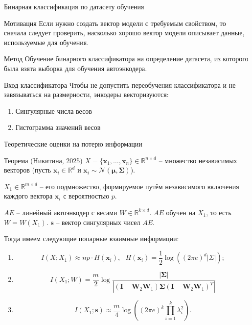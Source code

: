 \documentclass{beamer}
\begin{document}
\begin{frame}{Бинарная классификация по датасету обучения}
\begin{block}{Мотивация}
Если нужно создать вектор модели с требуемым свойством, то сначала следует проверить, насколько хорошо вектор модели описывает данные, используемые для обучения.
\end{block}
\begin{block}{Метод}
Обучение бинарного классификатора на определение датасета, из которого была взята выборка для обучения автоэнкодера.
\end{block}
\begin{block}{Вход классификатора}
Чтобы не допустить переобучения классификатора и не завязываться на размерности, энкодеры векторизуются:

\begin{enumerate}
    \item Сингулярные числа весов
    \item Гистограмма значений весов
\end{enumerate}
\end{block}
\end{frame}
\begin{frame}{Теоретические оценки на потерю информации}
\small
\begin{block}{Теорема (Никитина, 2025)}
$X = \{\mathbf{x}_1, \dots, \mathbf{x}_n\} \in \mathbb{R}^{n \times d}$ -- множество независимых векторов (пусть $\mathbf{x}_i \in \mathbb{R}^d$ и $\mathbf{x}_i \sim \mathcal{N}(\boldsymbol{\mu}, \boldsymbol{\Sigma})$).

$X_1 \in \mathbb{R}^{m \times d}$ -- его подмножество, формируемое путём независимого включения каждого вектора $\mathbf{x}_i$ с вероятностью $p$.

$AE$ -- линейный автоэнкодер с весами $W \in \mathbb{R}^{k\times d}$. $AE$ обучен на $X_1$, то есть $W = W(X_1)$. $\mathbf{s}$ -- вектор сингулярных чисел $AE$.

Тогда имеем следующие попарные взаимные информации:

\begin{enumerate}
    \item \[I(X; X_1) \approx np \cdot H(\mathbf{x}_i), ~~~  H(\mathbf{x}_i) = \frac{1}{2} \log \left( (2 \pi e)^d |\Sigma| \right);\]

    \item \[I(X_1; W) = \frac{m}{2} \log \frac{|\boldsymbol{\Sigma}|}{|(\mathbf{I} - \mathbf{W}_2 \mathbf{W}_1) \boldsymbol{\Sigma} (\mathbf{I} - \mathbf{W}_2 \mathbf{W}_1)^T|}\]

    \item \[I(X_1; \mathbf{s}) \approx \frac{m}{4} \log \left( (2\pi e)^k \prod_{i=1}^k \lambda_i^2 \right).\]
\end{enumerate}
\end{block}
\end{frame}
\end{document}
